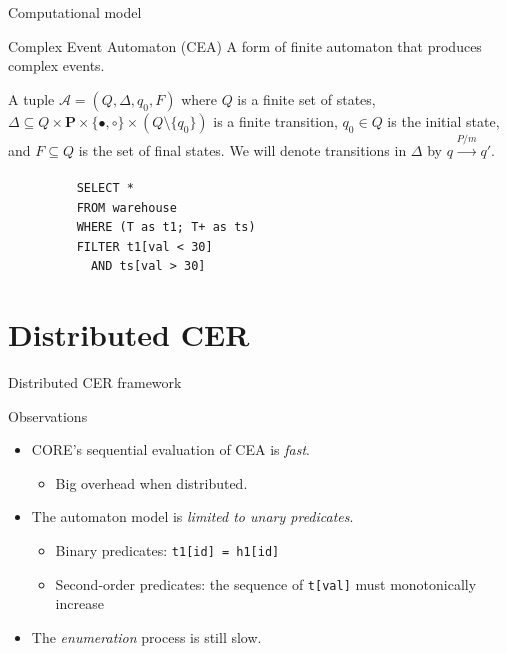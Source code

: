 \documentclass[xcolor=pdftex,dvipsnames,table]{beamer}
\newcommand{\inputtikz}[1]{%
  \tikzsetnextfilename{#1}%
  
}
\newcommand{\code}[1]{\texttt{#1}}
\begin{document}
\begin{frame}{Computational model}
  \begin{block}{Complex Event Automaton (CEA)}
     A form of finite automaton that produces complex events.
  \end{block}
  \begin{definition}
  A tuple $\mathcal{A} = (Q, \Delta, q_{0}, F)$ where $Q$ is a finite set of states, $\Delta \subseteq Q \times \textbf{P} \times \{\bullet, \circ\} \times (Q \setminus \{ q_{0} \})$ is a finite transition, $q_{0} \in Q$ is the initial state, and $F \subseteq Q$ is the set of final states. We will denote transitions in $\Delta$ by $q \xrightarrow[]{P/m} q'$.
  \end{definition}
  \begin{example}
    \begin{figure}[H]
      \begin{verbatim}
    SELECT *
    FROM warehouse
    WHERE (T as t1; T+ as ts)
    FILTER t1[val < 30]
      AND ts[val > 30]
      \end{verbatim}
    \end{figure}
    \begin{figure}[H]
      \centering
      \inputtikz{cea}
    \end{figure}
  \end{example}
\end{frame}


\section{Distributed CER}

\begin{frame}{Distributed CER framework}
  \begin{block}{Observations}
    \begin{itemize}
        \item CORE's sequential evaluation of CEA is \emph{fast}.
          \begin{itemize}
            \item Big overhead when distributed.
          \end{itemize}
        \pause
        \item The automaton model is \emph{limited to unary predicates}.
          \begin{itemize}
            \item Binary predicates: \code{t1[id] = h1[id]}
            \item Second-order predicates: the sequence of \code{t[val]} must monotonically increase
          \end{itemize}
        \pause
        \item The \emph{enumeration} process is still slow.
   \end{itemize}
  \end{block}
\end{frame}
\end{document}
